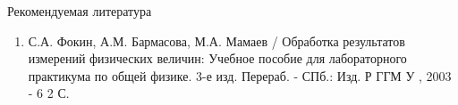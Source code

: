 Рекомендуемая литература
\begin{enumerate}
    \item С.А. Фокин, А.М.  Бармасова, М.А. Мамаев / Обработка результатов измерений физических величин: Учебное пособие для лабораторного практикума по общей физике. 3-е изд.
    Перераб. - СПб.: Изд. Р ГГМ У , 2003 - 6 2 С.
\end{enumerate}